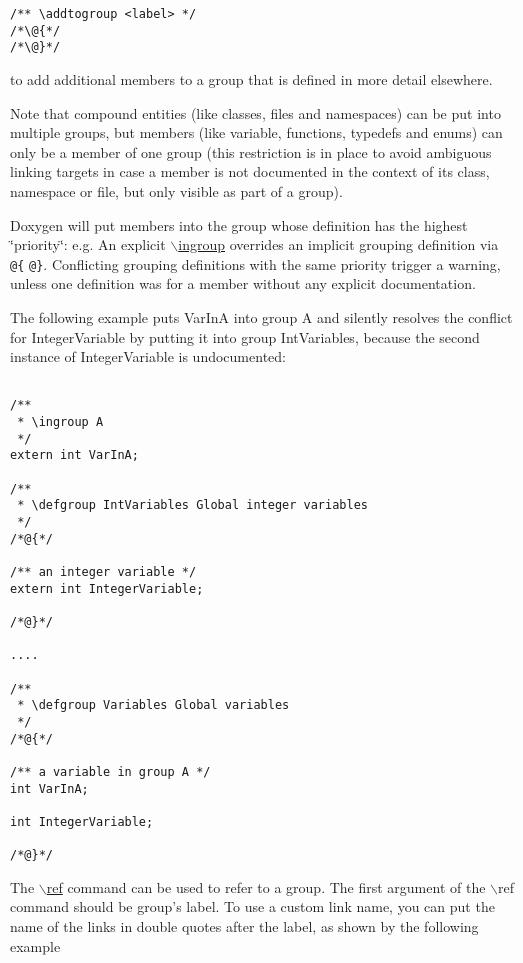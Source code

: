 \footnotesize\begin{verbatim}
/** \addtogroup <label> */
/*\@{*/
/*\@}*/
\end{verbatim}
\normalsize
 to add additional members to a group that is defined in more detail elsewhere.

Note that compound entities (like classes, files and namespaces) can be put into multiple groups, but members (like variable, functions, typedefs and enums) can only be a member of one group (this restriction is in place to avoid ambiguous linking targets in case a member is not documented in the context of its class, namespace or file, but only visible as part of a group).

Doxygen will put members into the group whose definition has the highest \char`\"{}priority\char`\"{}: e.g. An explicit \hyperlink{commands_cmdingroup}{$\backslash$ingroup} overrides an implicit grouping definition via {\tt @\{} {\tt @\}}. Conflicting grouping definitions with the same priority trigger a warning, unless one definition was for a member without any explicit documentation.

The following example puts VarInA into group A and silently resolves the conflict for IntegerVariable by putting it into group IntVariables, because the second instance of IntegerVariable is undocumented:



\footnotesize\begin{verbatim}

/**
 * \ingroup A
 */
extern int VarInA;

/**
 * \defgroup IntVariables Global integer variables
 */
/*@{*/

/** an integer variable */
extern int IntegerVariable;

/*@}*/

....

/**
 * \defgroup Variables Global variables
 */
/*@{*/

/** a variable in group A */
int VarInA;

int IntegerVariable;

/*@}*/
\end{verbatim}
\normalsize


The \hyperlink{commands_cmdref}{$\backslash$ref} command can be used to refer to a group. The first argument of the $\backslash$ref command should be group's label. To use a custom link name, you can put the name of the links in double quotes after the label, as shown by the following example 

